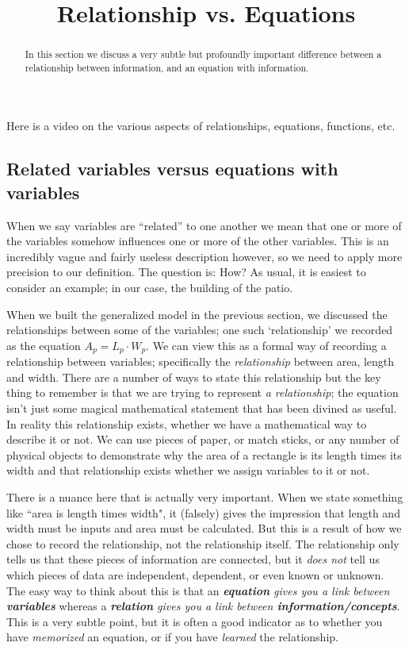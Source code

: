 \documentclass{ximera}
\title{Relationship vs. Equations}
\begin{document}
\begin{abstract}
    In this section we discuss a very subtle but profoundly important difference between a relationship between information, and an equation with information.
\end{abstract}
\maketitle

Here is a video on the various aspects of relationships, equations, functions, etc.


\subsection*{Related variables versus equations with variables}
    When we say variables are ``related'' to one another we mean that one or more of the variables somehow influences one or more of the other variables. This is an incredibly vague and fairly useless description however, so we need to apply more precision to our definition. The question is: How? As usual, it is easiest to consider an example; in our case, the building of the patio. 
    
    When we built the generalized model in the previous section, we discussed the relationships between some of the variables; one such `relationship' we recorded as the equation $A_p = L_p \cdot W_p$. We can view this as a formal way of recording a relationship between variables; specifically the \textit{relationship} between area, length and width. There are a number of ways to state this relationship but the key thing to remember is that we are trying to represent \textit{a relationship}; the equation isn't just some magical mathematical statement that has been divined as useful. In reality this relationship exists, whether we have a mathematical way to describe it or not. We can use pieces of paper, or match sticks, or any number of physical objects to demonstrate why the area of a rectangle is its length times its width and that relationship exists whether we assign variables to it or not.
    
    There is a nuance here that is actually very important. When we state something like ``area is length times width", it (falsely) gives the impression that length and width must be inputs and area must be calculated. But this is a result of how we chose to record the relationship, not the relationship itself.  The relationship only tells us that these pieces of information are connected, but it \textit{does not} tell us which pieces of data are independent, dependent, or even known or unknown. The easy way to think about this is that an \textit{\textbf{equation} gives you a link between \textbf{variables}} whereas a \textit{\textbf{relation} gives you a link between \textbf{information/concepts}}. This is a very subtle point, but it is often a good indicator as to whether you have \textit{memorized} an equation, or if you have \textit{learned} the relationship.
    
\end{document}
